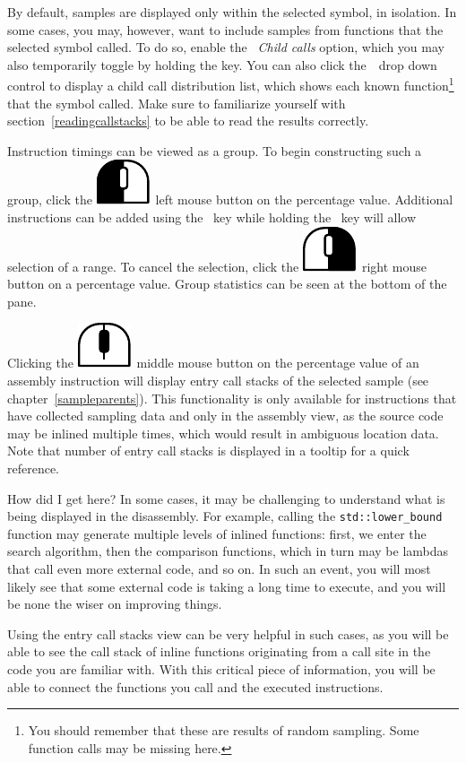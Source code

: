 \documentclass[hidelinks,titlepage,a4paper]{article}
\newcommand{\LMB}{\includegraphics[height=.8\baselineskip]{icons/lmb}}
\newcommand{\RMB}{\includegraphics[height=.8\baselineskip]{icons/rmb}}
\newcommand{\MMB}{\includegraphics[height=.8\baselineskip]{icons/mmb}}
\begin{document}
By default, samples are displayed only within the selected symbol, in isolation. In some cases, you may, however, want to include samples from functions that the selected symbol called. To do so, enable the \emph{\faSignOut*{}~Child calls} option, which you may also temporarily toggle by holding the  key. You can also click the~\faCaretDown{}~drop down control to display a child call distribution list, which shows each known function\footnote{You should remember that these are results of random sampling. Some function calls may be missing here.} that the symbol called. Make sure to familiarize yourself with section~\ref{readingcallstacks} to be able to read the results correctly.

Instruction timings can be viewed as a group. To begin constructing such a group, click the \LMB{}~left mouse button on the percentage value. Additional instructions can be added using the \keys{\ctrl}~key while holding the \keys{\shift}~key will allow selection of a range. To cancel the selection, click the \RMB{}~right mouse button on a percentage value. Group statistics can be seen at the bottom of the pane.

Clicking the \MMB{}~middle mouse button on the percentage value of an assembly instruction will display entry call stacks of the selected sample (see chapter~\ref{sampleparents}). This functionality is only available for instructions that have collected sampling data and only in the assembly view, as the source code may be inlined multiple times, which would result in ambiguous location data. Note that number of entry call stacks is displayed in a tooltip for a quick reference.

\begin{bclogo}[
noborder=true,
couleur=black!5,
logo=\bclampe
]{How did I get here?}
In some cases, it may be challenging to understand what is being displayed in the disassembly. For example, calling the \texttt{std::lower\_bound} function may generate multiple levels of inlined functions: first, we enter the search algorithm, then the comparison functions, which in turn may be lambdas that call even more external code, and so on. In such an event, you will most likely see that some external code is taking a long time to execute, and you will be none the wiser on improving things.

Using the entry call stacks view can be very helpful in such cases, as you will be able to see the call stack of inline functions originating from a call site in the code you are familiar with. With this critical piece of information, you will be able to connect the functions you call and the executed instructions.
\end{bclogo}
\end{document}
